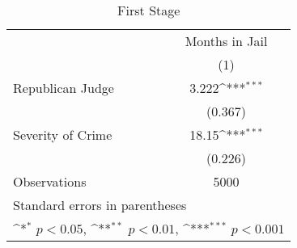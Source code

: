 \begin{table}[htbp]\centering
\def\sym#1{\ifmmode^{#1}\else\(^{#1}\)\fi}
\caption{\label{tab:assignment4} First Stage}
\begin{tabular*}{\hsize}{@{\hskip\tabcolsep\extracolsep\fill}l*{1}{c}}
\hline\hline
                    &\multicolumn{1}{c}{Months in Jail}\\
                    &\multicolumn{1}{c}{(1)}         \\
\hline
Republican Judge    &       3.222\sym{***}\\
                    &     (0.367)         \\
[1em]
Severity of Crime   &       18.15\sym{***}\\
                    &     (0.226)         \\
\hline
Observations        &        5000         \\
\hline\hline
\multicolumn{2}{l}{\footnotesize Standard errors in parentheses}\\
\multicolumn{2}{l}{\footnotesize \sym{*} \(p<0.05\), \sym{**} \(p<0.01\), \sym{***} \(p<0.001\)}\\
\end{tabular*}
\end{table}
